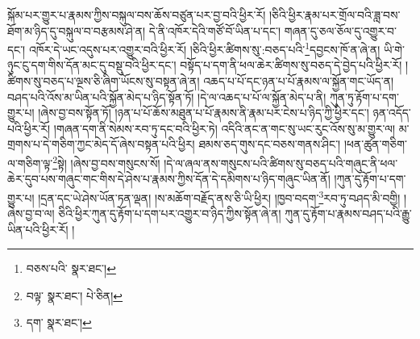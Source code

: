 སྐོམ་པར་གྱུར་པ་རྣམས་ཀྱིས་བསྐུལ་བས་ཆོས་བཙུན་པར་བྱ་བའི་ཕྱིར་རོ། །ཅིའི་ཕྱིར་རྣམ་པར་གྲོལ་བའི་ཟླ་བས་ཐོག་མ་ཉིད་དུ་བསྐུལ་བ་བརྩམས་ཤེ་ན། དེ་ནི་འཁོར་དེའི་གཙོ་བོ་ཡིན་པ་དང་། གཞན་དུ་ཅལ་ཅོལ་དུ་འགྱུར་བ་དང་། འཁོར་དེ་ཡང་འདུས་པར་འགྱུར་བའི་ཕྱིར་རོ། །ཅིའི་ཕྱིར་ཚིགས་སུ་:བཅད་པའི་\footnote{བཅས་པའི་  སྣར་ཐང་། }དབྱངས་ཁོ་ན་ཞེ་ན། ཡི་གེ་ཉུང་ངུ་དག་གིས་དོན་མང་དུ་བསྡུ་བའི་ཕྱིར་དང་། བསྟོད་པ་དག་ནི་ཕལ་ཆེར་ཚིགས་སུ་བཅད་དེ་བྱེད་པའི་ཕྱིར་རོ། །ཚིགས་སུ་བཅད་པ་ལྔས་ཅི་ཞིག་ཡོངས་སུ་བསྟན་ཞེ་ན། འཆད་པ་པོ་དང་ཉན་པ་པོ་རྣམས་ལ་སྐྱོན་གང་ཡོད་ན། བཤད་པའི་འོས་མ་ཡིན་པའི་སྐྱོན་མེད་པ་ཉིད་སྟོན་ཏོ། །དེ་ལ་འཆད་པ་པོ་ལ་སྐྱོན་མེད་པ་ནི། ཀུན་ཏུ་རྟོག་པ་དག་གྱུར་པ། །ཞེས་བྱ་བས་སྟོན་ཏོ། །ཉན་པ་པོ་ཆོས་མཐུན་པ་པོ་རྣམས་ནི་རྣམ་པར་ངེས་པ་ཉིད་ཀྱི་ཕྱིར་དང་། ཉན་འདོད་པའི་ཕྱིར་རོ། །གཞན་དག་ནི་སེམས་རབ་ཏུ་དང་བའི་ཕྱིར་ཏེ། འདིའི་ནང་ན་གང་སུ་ཡང་རུང་འོས་སུ་མ་གྱུར་ལ། མ་གྲགས་པ་དེ་གཅིག་ཀྱང་མེད་དོ་ཞེས་བསྟན་པའི་ཕྱིར། ཐམས་ཅད་གུས་དང་བཅས་གནས་ཤིང་། །ཕན་ཚུན་གཅིག་ལ་གཅིག་ལྟ་\footnote{བལྟ་  སྣར་ཐང་།  པེ་ཅིན། }སྟེ། །ཞེས་བྱ་བས་གསུངས་སོ། །དེ་ལ་ཞལ་ནས་གསུངས་པའི་ཚིགས་སུ་བཅད་པའི་གཞུང་ནི་ཕལ་ཆེར་དུབ་པས་གཞུང་གང་གིས་དེ་ཤེས་པ་རྣམས་ཀྱིས་དོན་དེ་དམིགས་པ་ཉིད་གཞུང་ཡིན་ནོ། །ཀུན་དུ་རྟོག་པ་དག་གྱུར་པ། །དྲན་དང་ཡེ་ཤེས་ཡོན་ཏན་ལྡན། །ས་མཆོག་བརྗོད་ནས་ཅི་ཡི་ཕྱིར། །ཁྱབ་བདག་\footnote{དག་  སྣར་ཐང་། }རབ་ཏུ་བཤད་མི་བགྱི། །ཞེས་བྱ་བ་ལ། ཅིའི་ཕྱིར་ཀུན་དུ་རྟོག་པ་དག་པར་འགྱུར་བ་ཉིད་ཀྱིས་སྟོན་ཞེ་ན། ཀུན་དུ་རྟོག་པ་རྣམས་བཤད་པའི་རྒྱུ་ཡིན་པའི་ཕྱིར་རོ། །
